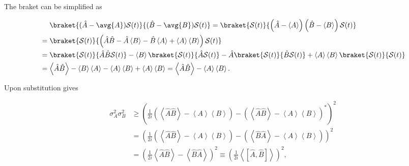 \documentclass[a4paper,12pt]{report}
\begin{document}
The braket can be simplified as

\begin{equation}
  \begin{aligned} 
  &~~~~\braket{(\hat{A} - \avg{A} )\mathcal{S}(t)}{(\hat{B} - \avg{B} )\mathcal{S}(t)} = \braket{\mathcal{S}(t)}{\left( \hat{A} - \left \langle {A} \right \rangle  \right) \left( \hat{B} - \left \langle {B} \right \rangle  \right) \mathcal{S}(t)} \\
  &= \braket{\mathcal{S}(t)}{\left( \hat{A} \hat{B} - \hat{A} \left \langle {B} \right \rangle - \hat{B} \left \langle {A} \right \rangle + \left \langle {A} \right \rangle \left \langle {B} \right \rangle  \right) \mathcal{S}(t)} \\
  &= \braket{\mathcal{S}(t)}{\hat{A} \hat{B} \mathcal{S}(t)} - \left \langle {B} \right \rangle \braket{\mathcal{S}(t)}{\hat{A} \mathcal{S}(t)} - \hat{A} \braket{\mathcal{S}(t)}{\hat{B} \mathcal{S}(t)} + \left \langle {A} \right \rangle \left \langle {B} \right \rangle \braket{\mathcal{S}(t)}{\mathcal{S}(t)} \\
  &= \left \langle {\hat{A} \hat{B} } \right \rangle - \left \langle {B} \right \rangle \left \langle {A} \right \rangle - \left \langle {A} \right \rangle \left \langle {B} \right \rangle + \left \langle {A} \right \rangle \left \langle {B} \right \rangle = \left \langle {\hat{A} \hat{B} } \right \rangle - \left \langle {A} \right \rangle \left \langle {B} \right \rangle.
  \end{aligned} 
\end{equation}

Upon substitution gives

\begin{equation}
  \begin{aligned} 
  \sigma _{A}^2\sigma _{B}^2 &\ge \left( \frac{1}{2i} \left( \left \langle {\hat{A} \hat{B} } \right \rangle  - \left \langle {A} \right \rangle \left \langle {B} \right \rangle  \right) - \left( \left \langle {\hat{A} \hat{B} } \right \rangle - \left \langle {A} \right \rangle \left \langle {B} \right \rangle   \right)^*  \right)^2 \\
  &= \left( \frac{1}{2i}  \left( \left \langle {\hat{A} \hat{B} } \right \rangle  - \left \langle {A} \right \rangle \left \langle {B} \right \rangle  \right) - \left( \left \langle {\hat{B} \hat{A} } \right \rangle - \left \langle {A} \right \rangle \left \langle {B} \right \rangle  \right)  \right)^2 \\
  &= \left( \frac{1}{2i} \left \langle {\hat{A} \hat{B} } \right \rangle - \left \langle {\hat{B} \hat{A} } \right \rangle   \right)^2 \equiv \left( \frac{1}{2i} \left \langle {\left[ \hat{A} ,\hat{B}  \right]} \right \rangle \right)^2,
  \end{aligned} 
\end{equation}
\end{document}
